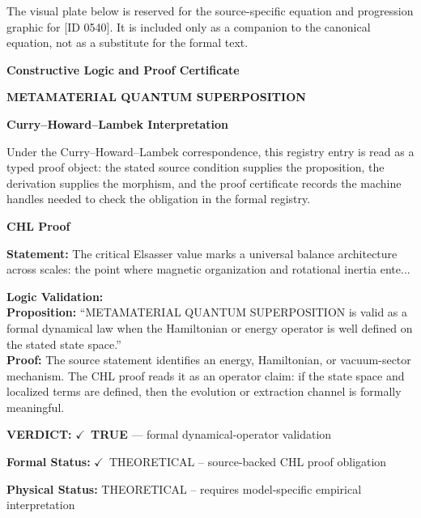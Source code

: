 \begingroup\footnotesize\sloppy
The visual plate below is reserved for the source-specific equation and progression graphic for [ID 0540]. It is included only as a companion to the canonical equation, not as a substitute for the formal text.
\par\endgroup
\ifTZPDarkEdition
{}
\fi

\clearpage
\begingroup\tzpsupportsetup
\noindent\textbf{\fontsize{10.8pt}{12.8pt}\selectfont [ID 0540] Constructive Logic and Proof Certificate}\par
\noindent\textbf{\fontsize{10pt}{12pt}\selectfont METAMATERIAL QUANTUM SUPERPOSITION}\par
\vspace{0.45em}
\begingroup
\footnotesize
\setlength{\parskip}{0.22em}
\setlength{\parindent}{0pt}
\noindent\textbf{Curry--Howard--Lambek Interpretation}\par
Under the Curry--Howard--Lambek correspondence, this registry entry is read as a typed proof
object: the stated source condition supplies the proposition, the derivation supplies the
morphism, and the proof certificate records the machine handles needed to check the obligation
in the formal registry.

\vspace{0.45em}
\noindent\textbf{CHL Proof}\par
\textbf{Statement:} The critical Elsasser value marks a universal balance architecture across scales: the
point where magnetic organization and rotational inertia ente...

\textbf{Logic Validation:}\\
\textbf{Proposition:} ``METAMATERIAL QUANTUM SUPERPOSITION is valid as a formal dynamical law when the
Hamiltonian or energy operator is well defined on the stated state space.''\\
\textbf{Proof:} The source statement identifies an energy, Hamiltonian, or vacuum-sector mechanism. The
CHL proof reads it as an operator claim: if the state space and localized terms are
defined, then the evolution or extraction channel is formally meaningful.

\textbf{VERDICT:} \ensuremath{\checkmark}\ \textbf{TRUE} --- formal dynamical-operator validation

\textbf{Formal Status:} \ensuremath{\checkmark}\ THEORETICAL -- source-backed CHL proof obligation

\textbf{Physical Status:} THEORETICAL -- requires model-specific empirical interpretation
\par\vspace{0.45em}
\par
\ifTZPDarkEdition
{}
\fi
\endgroup
\endgroup
